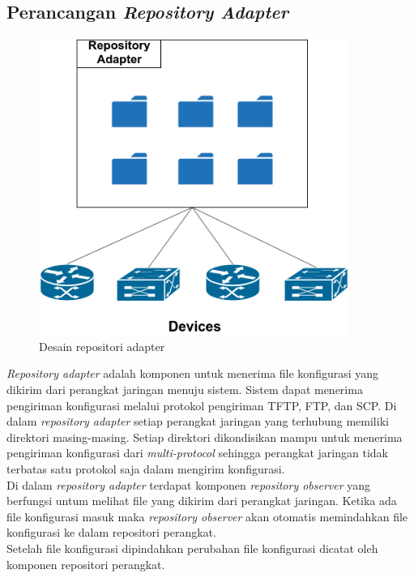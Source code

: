                 
		\subsection{Perancangan \textit{Repository Adapter} }
			\begin{figure}[H]
				\centering
				\includegraphics[width=0.9\textwidth]{Images/C-3/Repository-Adapter.png}
				\caption{Desain repositori adapter}
				\label{DesainRepositoriadapter}
			\end{figure}
			\textit{Repository adapter} adalah komponen untuk menerima file konfigurasi yang dikirim dari perangkat jaringan menuju sistem. Sistem dapat menerima pengiriman konfigurasi melalui protokol pengiriman TFTP, FTP, dan SCP. Di dalam \textit{repository adapter} setiap perangkat jaringan yang terhubung memiliki direktori masing-masing. Setiap direktori dikondisikan mampu untuk menerima pengiriman konfigurasi dari \textit{multi-protocol} sehingga perangkat jaringan tidak terbatas satu protokol saja dalam mengirim konfigurasi.\\
			\indent Di dalam \textit{repository adapter} terdapat komponen \textit{repository observer} yang berfungsi untum melihat file yang dikirim dari perangkat jaringan. Ketika ada file konfigurasi masuk maka \textit{repository observer} akan otomatis memindahkan file konfigurasi ke dalam repositori perangkat.\\
			\indent Setelah file konfigurasi dipindahkan perubahan file konfigurasi dicatat oleh komponen repositori perangkat. 
			
